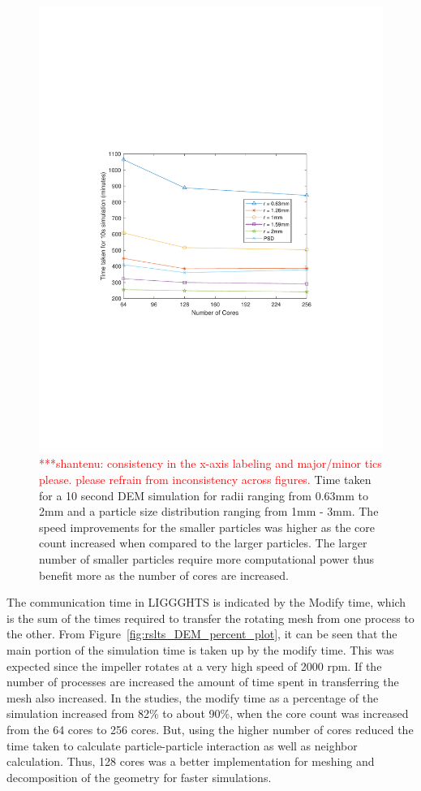 \documentclass[preprint,11pt,authoryear]{elsarticle}
\newcommand{\jhanote}[1]{ {\textcolor{red} { ***shantenu: #1 }}}
\newcommand{\jhanote}[1]{ {\textcolor{red} { ***shantenu: #1 }}}
\begin{document}
\begin{figure}
\centering
\includegraphics[scale=0.7]{rslsts_DEM_alldia_timing_mtlb.pdf}
\caption{ \jhanote{consistency in the x-axis labeling and major/minor tics please. please refrain from inconsistency across figures.}
Time taken for a 10 second DEM simulation for radii ranging from
 0.63mm to 2mm and a particle size distribution ranging from 1mm - 3mm. The speed improvements 
 for the smaller particles was higher as the core count increased when compared to the larger particles. 
 The larger number of smaller particles require more computational power thus benefit more as the number 
 of cores are increased. }
\label{fig:rslts_DEM_timing_studies}
\end{figure}

The communication time in LIGGGHTS is indicated by the Modify time, which is the sum of the 
times required to transfer the rotating mesh from one process to the other. From Figure~\ref{fig:rslts_DEM_percent_plot}, it can be seen that the main portion of the simulation time is taken up by 
the modify time. This was expected since the impeller rotates at a very high speed of 2000 rpm. If 
the number of processes are increased the amount of time spent in transferring the mesh also 
increased. In the studies, the modify time as a percentage of the simulation increased from 82\% to 
about 90\%, when the core count was increased from the 64 cores to 256 cores. But, using the 
higher number of cores reduced the time taken to calculate particle-particle interaction as well as  
neighbor calculation. Thus, 128 cores was a better implementation for meshing and decomposition of the 
geometry for faster simulations.
\end{document}
